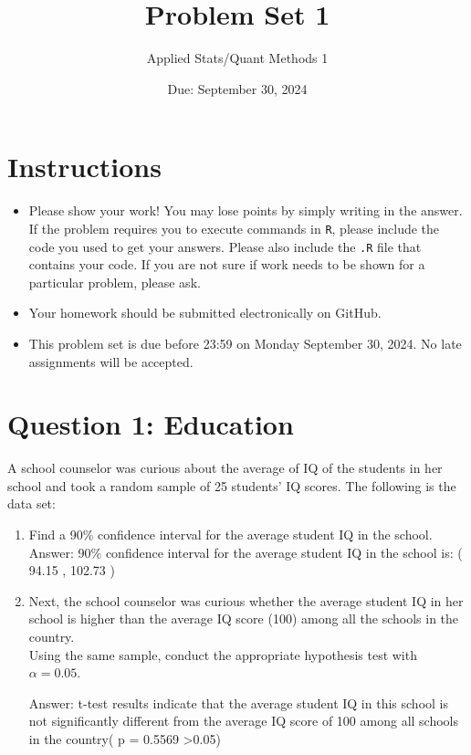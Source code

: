 \documentclass[12pt,letterpaper]{article}
\title{Problem Set 1}
\date{Due: September 30, 2024}
\author{Applied Stats/Quant Methods 1}
\begin{document}
	\maketitle
	
	\section*{Instructions}
	\begin{itemize}
	\item Please show your work! You may lose points by simply writing in the answer. If the problem requires you to execute commands in \texttt{R}, please include the code you used to get your answers. Please also include the \texttt{.R} file that contains your code. If you are not sure if work needs to be shown for a particular problem, please ask.
\item Your homework should be submitted electronically on GitHub.
\item This problem set is due before 23:59 on Monday September 30, 2024. No late assignments will be accepted.
	\end{itemize}
	
	\vspace{1cm}
	\section*{Question 1: Education}

A school counselor was curious about the average of IQ of the students in her school and took a random sample of 25 students' IQ scores. The following is the data set:\\
\vspace{.5cm}

  

\vspace{1cm}

\begin{enumerate}
	\item Find a 90\% confidence interval for the average student IQ in the school.\\
	 
\noindent Answer: 90\% confidence interval for the average student IQ in the school is: ( 94.15 , 102.73 )

	\item Next, the school counselor was curious  whether  the average student IQ in her school is higher than the average IQ score (100) among all the schools in the country.\\ 
	
	\noindent Using the same sample, conduct the appropriate hypothesis test with $\alpha=0.05$.
	 
\noindent Answer: t-test results indicate that the average student IQ in this school is not significantly different from the average IQ score of 100 among all schools in the country( p = 0.5569 \textgreater 0.05)
\end{enumerate}
\end{document}
